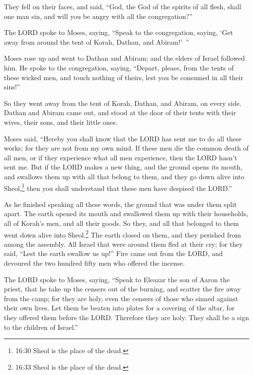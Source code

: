 \myverse{}They fell on their faces, and said, “God, the God of the spirits
of all flesh, shall one man sin, and will you be angry with all the congregation?”


\myverse{}The LORD spoke to Moses, saying,
\myverse{}“Speak to the congregation, saying, ‘Get away from around the tent of Korah,
Dathan, and Abiram!’ ”


\myverse{}Moses rose up and went to Dathan and Abiram; and the elders
of Israel followed him.
\myverse{}He spoke to the congregation, saying, “Depart, please, from the tents of
these wicked men, and touch nothing of theirs, lest you be consumed in all their sins!”


\myverse{}So they went away from the tent of Korah, Dathan, and Abiram,
on every side. Dathan and Abiram came out, and stood at the door of their tents with their wives, their
sons, and their little ones.


\myverse{}Moses said, “Hereby you shall know that the LORD has sent me
to do all these works; for they are not from my own mind.
\myverse{}If these men die the common death of all men, or if they experience what
all men experience, then the LORD hasn’t sent me.
\myverse{}But if the LORD makes a new thing, and the ground opens its mouth, and swallows
them up with all that belong to them, and they go down alive into Sheol,\footnote{ 16:30 Sheol is the place of the dead.} then you shall understand that these men have despised
the LORD.”


\myverse{}As he finished speaking all these words, the ground that was
under them split apart.
\myverse{}The earth opened its mouth and swallowed them up with their households, all
of Korah’s men, and all their goods.
\myverse{}So they, and all that belonged to them went down alive into Sheol.\footnote{ 16:33 Sheol is the place of the dead.} The earth closed on them, and they perished from among
the assembly.
\myverse{}All Israel that were around them fled at their cry; for they said, “Lest
the earth swallow us up!”
\myverse{}Fire came out from the LORD, and devoured the two hundred fifty men who offered
the incense.


\myverse{}The LORD spoke to Moses, saying,
\myverse{}“Speak to Eleazar the son of Aaron the priest, that he take up the censers
out of the burning, and scatter the fire away from the camp; for they are holy,
\myverse{}even the censers of those who sinned against their own lives. Let them be
beaten into plates for a covering of the altar, for they offered them before the LORD. Therefore they
are holy. They shall be a sign to the children of Israel.”


